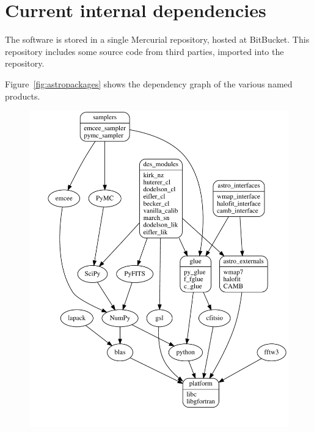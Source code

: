 \documentclass[draftmode,draftwater]{memarticle}
\newcommand{\despipe}{\name{des-pipe}\xspace}
\begin{document}
\section{Current internal dependencies}

The \despipe software is stored in a single
Mercurial\cite{mercurial} repository, hosted at
BitBucket\cite{bitbucket}. This repository includes some source code
from third parties, imported into the repository.

Figure~\ref{fig:astropackages} shows the dependency graph of the various
named products.

\begin{figure}
  \centering {} {%
    \includegraphics[width=0.95\textheight]{astro_packages}
  }{%
}
\end{figure}
\end{document}
